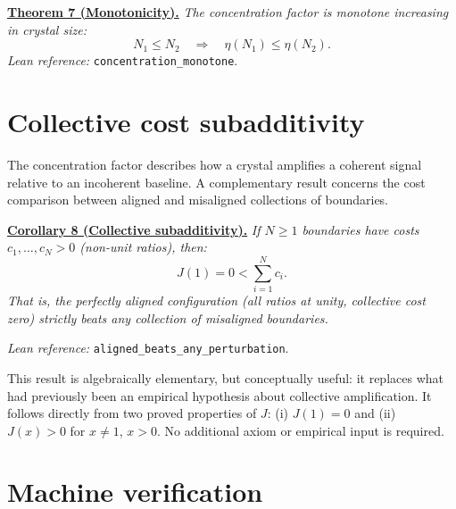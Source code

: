 \documentclass[prb,twocolumn,nofootinbib,superscriptaddress]{revtex4-2}
\newcommand{\J}{J}
\newcommand{\lean}[1]{\texttt{\small #1}}
\begin{document}
\vspace{2mm}
\underline{\bf Theorem 7 (Monotonicity).}
\emph{The concentration factor is monotone increasing in crystal size:}
\begin{equation}
N_1 \leq N_2 \quad \Longrightarrow \quad \eta(N_1) \leq \eta(N_2).
\end{equation}
\emph{Lean reference:} \lean{concentration\_monotone}.
\vspace{2mm}

\section{Collective cost subadditivity}
\label{sec:collective}

The concentration factor describes how a crystal amplifies a coherent signal relative to an incoherent baseline.
A complementary result concerns the cost comparison between aligned and misaligned collections of boundaries.

\vspace{2mm}
\underline{\bf Corollary 8 (Collective subadditivity).}
\emph{If $N \geq 1$ boundaries have costs $c_1, \ldots, c_N > 0$ (non-unit ratios), then:}
\begin{equation}
\J(1) = 0 < \sum_{i=1}^{N} c_i.
\end{equation}
\emph{That is, the perfectly aligned configuration (all ratios at unity, collective cost zero) strictly beats any collection of misaligned boundaries.}

\emph{Lean reference:} \lean{aligned\_beats\_any\_perturbation}.
\vspace{2mm}

This result is algebraically elementary, but conceptually useful: it replaces what had previously been an empirical hypothesis about collective amplification.
It follows directly from two proved properties of $\J$: (i) $\J(1) = 0$ and (ii) $\J(x) > 0$ for $x \neq 1$, $x > 0$.
No additional axiom or empirical input is required.

\section{Machine verification}
\label{sec:lean}
\end{document}
